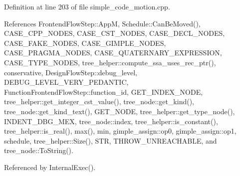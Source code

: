 Definition at line 203 of file simple\+\_\+code\+\_\+motion.\+cpp.



References Frontend\+Flow\+Step\+::\+AppM, Schedule\+::\+Can\+Be\+Moved(), C\+A\+S\+E\+\_\+\+C\+P\+P\+\_\+\+N\+O\+D\+ES, C\+A\+S\+E\+\_\+\+C\+S\+T\+\_\+\+N\+O\+D\+ES, C\+A\+S\+E\+\_\+\+D\+E\+C\+L\+\_\+\+N\+O\+D\+ES, C\+A\+S\+E\+\_\+\+F\+A\+K\+E\+\_\+\+N\+O\+D\+ES, C\+A\+S\+E\+\_\+\+G\+I\+M\+P\+L\+E\+\_\+\+N\+O\+D\+ES, C\+A\+S\+E\+\_\+\+P\+R\+A\+G\+M\+A\+\_\+\+N\+O\+D\+ES, C\+A\+S\+E\+\_\+\+Q\+U\+A\+T\+E\+R\+N\+A\+R\+Y\+\_\+\+E\+X\+P\+R\+E\+S\+S\+I\+ON, C\+A\+S\+E\+\_\+\+T\+Y\+P\+E\+\_\+\+N\+O\+D\+ES, tree\+\_\+helper\+::compute\+\_\+ssa\+\_\+uses\+\_\+rec\+\_\+ptr(), conservative, Design\+Flow\+Step\+::debug\+\_\+level, D\+E\+B\+U\+G\+\_\+\+L\+E\+V\+E\+L\+\_\+\+V\+E\+R\+Y\+\_\+\+P\+E\+D\+A\+N\+T\+IC, Function\+Frontend\+Flow\+Step\+::function\+\_\+id, G\+E\+T\+\_\+\+I\+N\+D\+E\+X\+\_\+\+N\+O\+DE, tree\+\_\+helper\+::get\+\_\+integer\+\_\+cst\+\_\+value(), tree\+\_\+node\+::get\+\_\+kind(), tree\+\_\+node\+::get\+\_\+kind\+\_\+text(), G\+E\+T\+\_\+\+N\+O\+DE, tree\+\_\+helper\+::get\+\_\+type\+\_\+node(), I\+N\+D\+E\+N\+T\+\_\+\+D\+B\+G\+\_\+\+M\+EX, tree\+\_\+node\+::index, tree\+\_\+helper\+::is\+\_\+constant(), tree\+\_\+helper\+::is\+\_\+real(), max(), min, gimple\+\_\+assign\+::op0, gimple\+\_\+assign\+::op1, schedule, tree\+\_\+helper\+::\+Size(), S\+TR, T\+H\+R\+O\+W\+\_\+\+U\+N\+R\+E\+A\+C\+H\+A\+B\+LE, and tree\+\_\+node\+::\+To\+String().



Referenced by Internal\+Exec().

